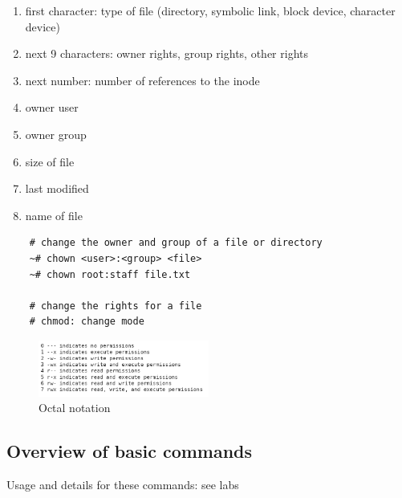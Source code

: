 \documentclass{article}
\begin{document}
\begin{enumerate}
    \item first character: type of file (directory, symbolic link, block device, character device)
    \item next 9 characters: owner rights, group rights, other rights
    \item next number: number of references to the inode
    \item owner user
    \item owner group
    \item size of file
    \item last modified
    \item name of file
\end{enumerate}

\begin{verbatim}
    # change the owner and group of a file or directory
    ~# chown <user>:<group> <file>
    ~# chown root:staff file.txt
    
    # change the rights for a file
    # chmod: change mode
\end{verbatim}

\begin{figure}[H]
    \centering
    \includegraphics[width=0.5\textwidth]{octal-notation.png}
    \caption{Octal notation}
\end{figure}


\subsection{Overview of basic commands}

Usage and details for these commands: see labs
\end{document}
